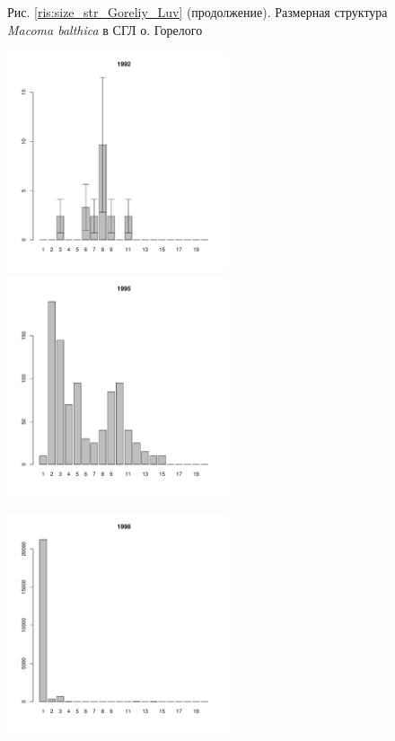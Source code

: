 \documentclass[12pt, a4paper]{article}
\begin{document}
\begin{figure}[h]


\begin{center}
Рис. \ref{ris:size_str_Goreliy_Luv} (продолжение). Размерная структура {\it Macoma balthica} в СГЛ о. Горелого

\end{center}
\end{figure}



\begin{figure}[h]

\begin{multicols}{3}
\hfill
\includegraphics[width=65mm]{../White_Sea/Luvenga_Goreliy/midlow_1992_.pdf}
\hfill
\includegraphics[width=65mm]{../White_Sea/Luvenga_Goreliy/midlow_1995_.pdf}

\hfill
\includegraphics[width=65mm]{../White_Sea/Luvenga_Goreliy/midlow_1998_.pdf}


\end{multicols}
\end{figure}
\end{document}
